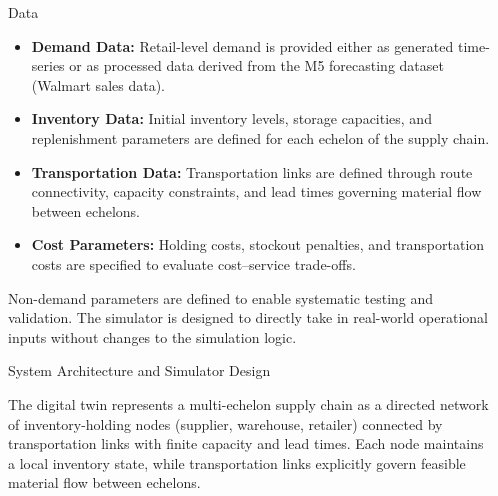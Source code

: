 \documentclass[final]{beamer}
\newlength{\sepwidth}
\newlength{\colwidth}
\newcommand{\separatorcolumn}{\begin{column}{\sepwidth}\end{column}}
\begin{document}
\begin{frame}[t]
\begin{columns}[t]
	\end{columns}

	\begin{columns}[t]
		\separatorcolumn
		
		\begin{column}{\colwidth}
			
			\begin{block}{Data}

			\begin{itemize}
				\item \textbf{Demand Data:}  
				Retail-level demand is provided either as generated time-series or as processed data derived from the M5 forecasting dataset (Walmart sales data).

				\item \textbf{Inventory Data:}  
				Initial inventory levels, storage capacities, and replenishment parameters are defined for each echelon of the supply chain.

				\item \textbf{Transportation Data:}  
				Transportation links are defined through route connectivity, capacity constraints, and lead times governing material flow between echelons.

				\item \textbf{Cost Parameters:}  
				Holding costs, stockout penalties, and transportation costs are specified to evaluate cost–service trade-offs.
			\end{itemize}

			\vspace{0.4em}
			Non-demand parameters are defined to enable systematic testing and validation. The simulator is designed to directly take in real-world operational inputs without changes to the simulation logic.

			\end{block}



			\begin{block}{System Architecture and Simulator Design}

			The digital twin represents a multi-echelon supply chain as a directed network of inventory-holding nodes 
			(supplier, warehouse, retailer) connected by transportation links with finite capacity and lead times. 
			Each node maintains a local inventory state, while transportation links explicitly govern feasible material
			flow between echelons.

			\vspace{0.4em}


\end{block}
\end{column}
\end{columns}
\end{frame}
\end{document}
